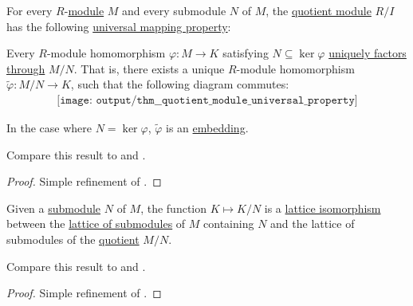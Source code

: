 \begin{theorem}\label{thm:quotient_module_universal_property}
  For every \( R \)-\hyperref[def:module]{module} \( M \) and every submodule \( N \) of \( M \), the \hyperref[def:module/quotient]{quotient module} \( R / I \) has the following \hyperref[rem:universal_mapping_property]{universal mapping property}:
  \begin{displayquote}
    Every \( R \)-module homomorphism \( \varphi: M \to K \) satisfying \( N \subseteq \ker \varphi \) \hyperref[def:factors_through]{uniquely factors through} \( M / N \). That is, there exists a unique \( R \)-module homomorphism \( \widetilde{\varphi}: M / N \to K \), such that the following diagram commutes:
    \begin{equation}\label{eq:thm:quotient_module_universal_property/diagram}
      \begin{aligned}
        \texttt{[image: output/thm\_\_quotient\_module\_universal\_property]}
      \end{aligned}
    \end{equation}

    In the case where \( N = \ker \varphi \), \( \widetilde{\varphi} \) is an \hyperref[def:first_order_embedding]{embedding}.
  \end{displayquote}

  Compare this result to  and .
\end{theorem}
\begin{proof}
  Simple refinement of .
\end{proof}

\begin{theorem}\label{thm:quotient_submodule_lattice_theorem}
  Given a \hyperref[def:module/submodel]{submodule} \( N \) of \( M \), the function \( K \mapsto K / N \) is a \hyperref[def:semilattice/homomorphism]{lattice isomorphism} between the \hyperref[thm:substructures_form_complete_lattice]{lattice of submodules} of \( M \) containing \( N \) and the lattice of submodules of the \hyperref[def:module/quotient]{quotient} \( M / N \).

  Compare this result to  and .
\end{theorem}
\begin{proof}
  Simple refinement of .
\end{proof}


